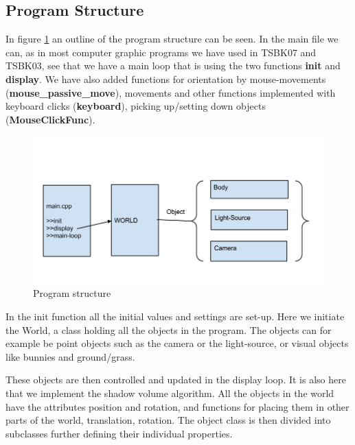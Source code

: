 \documentclass[a4paper, 12pt]{article}
\begin{document}
\subsection{Program Structure}
In figure \ref{fig:program} an outline of the program structure can be seen. In the main file we can, as in most computer graphic programs we have used in TSBK07 and TSBK03, see that we have a main loop that is using the two functions \textbf{init} and \textbf{display}. We have also added functions for orientation by mouse-movements (\textbf{mouse\_passive\_move}), movements and other functions implemented with keyboard clicks (\textbf{keyboard}), picking up/setting down objects (\textbf{MouseClickFunc}). 
\begin{figure}[h]
\centering
\includegraphics[width=\textwidth]{program.png}
\caption{Program structure}
\label{fig:program}
\end{figure}
In the init function all the initial values and settings are set-up. Here we initiate the World, a class holding all the objects in the program. The objects can for example be point objects such as the camera or the light-source,  or visual objects like bunnies and ground/grass.

These objects are then controlled and updated in the display loop. It is also here that we implement the shadow volume algorithm. All the objects in the world have the attributes position and rotation, and functions for placing them in other parts of the world, translation, rotation. The object class is then divided into subclasses further defining their individual properties.  
\end{document}
